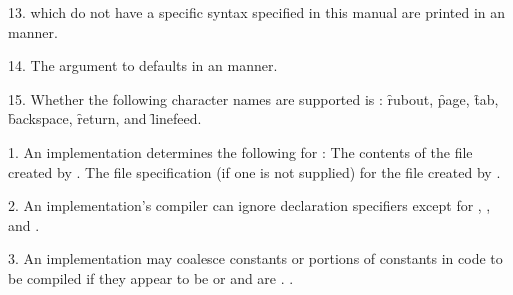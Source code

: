 
\item{13.}  which do not have a specific syntax
specified in this manual are printed in an  manner.  

\item{14.} The  argument to 
defaults in an  manner.

\item{15.} Whether the following 
character names are supported is :
\f{rubout}, \f{page}, \f{tab}, \f{backspace}, \f{return}, and \f{linefeed}.

\endlist
\endsubSection%
                           

\beginlist
\item{1.}
An implementation determines the following for :
\beginlist
{} The contents of the file created by .
 The file 
specification (if one is not supplied)
for the file created by .
\endlist
\item{2.}
An implementation's compiler can ignore declaration specifiers
except for , , and .

\item{3.} An implementation may coalesce constants or portions of constants
in code to be compiled if they appear to be 
or  and are .
\Seesection\Compilation.

\endlist
\endsubSection%


